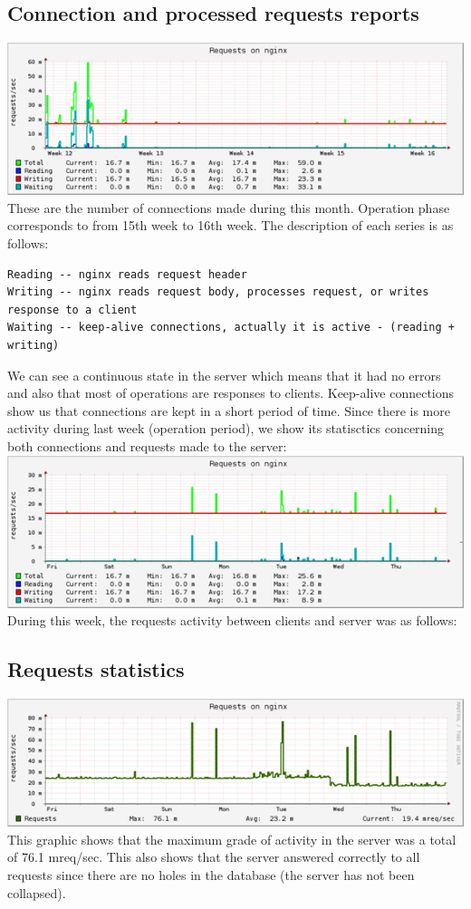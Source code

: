 \subsection{Connection and processed requests reports}
\includegraphics{statistics/img1.png}
These are the number of connections made during this month.  Operation phase corresponds to from 15th week to 16th week. The description of each series is as follows:
\begin{lstlisting}
Reading -- nginx reads request header
Writing -- nginx reads request body, processes request, or writes response to a client
Waiting -- keep-alive connections, actually it is active - (reading + writing)
\end{lstlisting}
We can see a continuous state in the server which means that it had no errors and also that most of operations are responses to clients. Keep-alive connections show us that connections are kept in a short period of time.
Since there is more activity during last week (operation period), we show its statisctics concerning both connections and requests made to the server:\\
\includegraphics{statistics/img2.png}
 During this week, the requests activity between clients and server was as follows:
\subsection{Requests statistics}
\includegraphics{statistics/img3.png} \\
This graphic shows that the maximum grade of activity in the server was a total of  76.1 mreq/sec. This also shows that the server answered correctly to all requests since there are no holes in the database (the server has not been collapsed).
\pagebreak